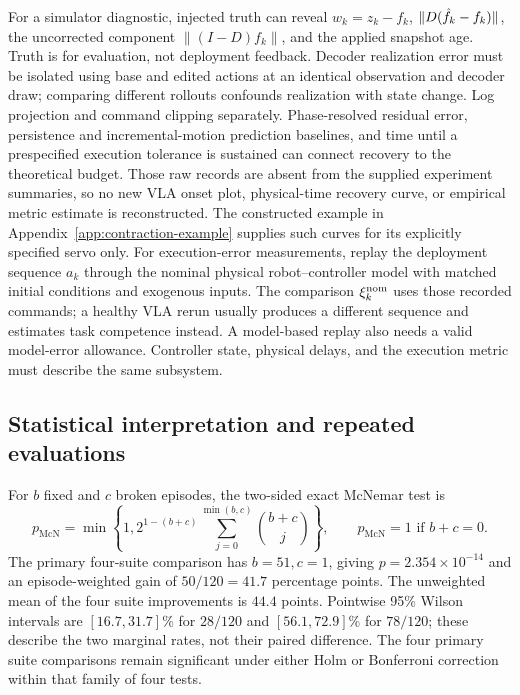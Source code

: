 For a simulator diagnostic, injected truth can reveal $w_k=z_k-f_k$,
$\|D(\hat f_k-f_k)\|$, the uncorrected component $\|(I-D)f_k\|$, and the
applied snapshot age. Truth is for evaluation, not deployment feedback.
Decoder realization error must be isolated using base and edited actions at
an identical observation and decoder draw; comparing different rollouts
confounds realization with state change. Log projection and command clipping
separately. Phase-resolved residual error, persistence and incremental-motion
prediction baselines, and time until a prespecified execution tolerance is
sustained can connect recovery to the theoretical budget. Those raw records
are absent from the supplied experiment summaries, so no new VLA onset plot,
physical-time recovery curve, or empirical metric estimate is reconstructed.
The constructed example in Appendix~\ref{app:contraction-example} supplies
such curves for its explicitly specified servo only.
For execution-error measurements, replay the deployment sequence
$a_k$ through the nominal physical robot--controller model
with matched initial conditions and exogenous inputs. The comparison
$\xi_{k}^{\rm nom}$ uses those recorded commands; a healthy VLA rerun usually produces
a different sequence and estimates task competence instead. A model-based
replay also needs a valid model-error allowance. Controller state, physical
delays, and the execution metric must describe the same subsystem.

\subsection{Statistical interpretation and repeated evaluations}
\label{app:statistics}

For $b$ fixed and $c$ broken episodes, the two-sided exact McNemar test is
\begin{equation}
 p_{\mathrm{McN}}=\min\left\{1,
 2^{1-(b+c)}\sum_{j=0}^{\min(b,c)}\binom{b+c}{j}\right\},
 \qquad p_{\mathrm{McN}}=1\text{ if }b+c=0.
\end{equation}
The primary four-suite comparison has $b=51,c=1$, giving
$p=2.354\times10^{-14}$ and an episode-weighted gain of $50/120=41.7$ percentage
points. The unweighted mean of the four suite improvements is $44.4$ points.
Pointwise 95\% Wilson intervals are $[16.7,31.7]\%$ for $28/120$ and
$[56.1,72.9]\%$ for $78/120$; these describe the two marginal rates, not their
paired difference. The four primary suite comparisons remain significant under either
Holm or Bonferroni correction within that family of four tests.

